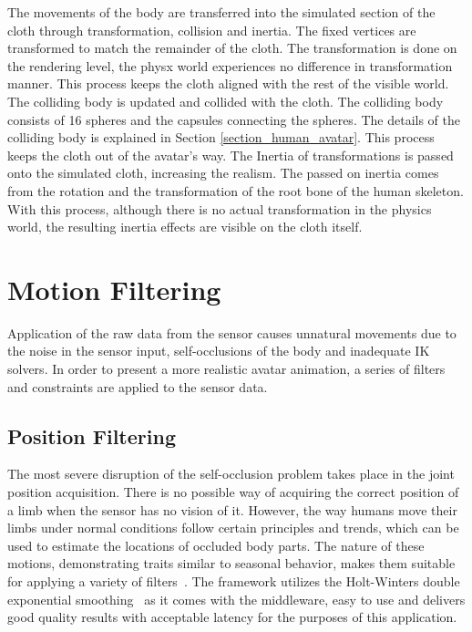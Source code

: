 The movements of the body are transferred into the simulated section of the cloth through transformation, collision and inertia. The fixed vertices are transformed to match the remainder of the cloth. The transformation is done on the rendering level, the physx world experiences no difference in transformation manner. This process keeps the cloth aligned with the rest of the visible world. The colliding body is updated and collided with the cloth. The colliding body consists of 16 spheres and the capsules connecting the spheres. The details of the colliding body is explained in Section \ref{section_human_avatar}. This process keeps the cloth out of the avatar's way. The Inertia of transformations is passed onto the simulated cloth, increasing the realism. The passed on inertia comes from the rotation and the transformation of the root bone of the human skeleton. With this process, although there is no actual transformation in the physics world, the resulting inertia effects are visible on the cloth itself. 

\section{Motion Filtering}
\label{section_motion_filtering}

Application of the raw data from the sensor causes unnatural movements due to the noise in the sensor input, self-occlusions of the body and inadequate IK solvers. In order to present a more realistic avatar animation, a series of filters and constraints are applied to the sensor data. 

\subsection{Position Filtering}
The most severe disruption of the self-occlusion problem takes place in the joint position acquisition. There is no possible way of acquiring the correct position of a limb when the sensor has no vision of it. However, the way humans move their limbs under normal conditions follow certain principles and trends, which can be used to estimate the locations of occluded body parts. The nature of these motions, demonstrating traits similar to seasonal behavior, makes them suitable for applying a variety of filters~\cite{Azimi2012}. The framework utilizes the Holt-Winters double exponential smoothing~\cite{Holt2004,Kalekar2004}  as it comes with the middleware, easy to use and delivers good quality results with acceptable latency for the purposes of this application. 

